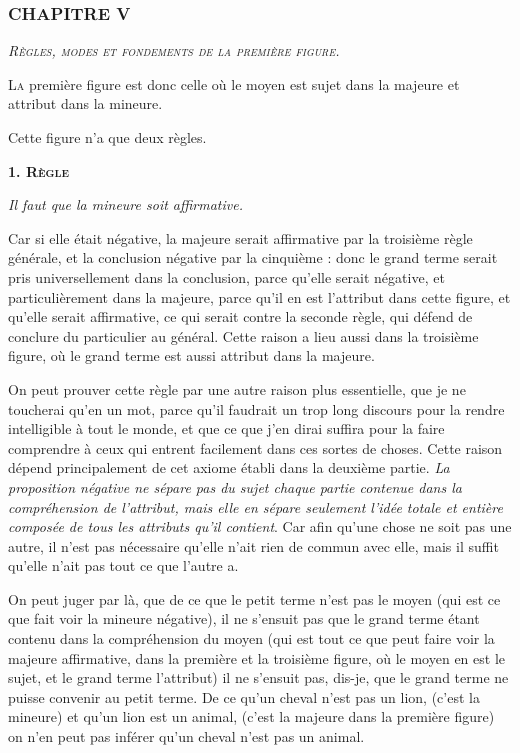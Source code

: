 \subsubsection{\centering \Large CHAPITRE V}
\begin{center}\emph{\large\scshape Règles, modes et fondements de la première figure.}\end{center}

	\lettrine{L}{a} première figure est donc celle où le moyen est sujet dans la majeure et attribut dans la mineure.

Cette figure n'a que deux règles.

\begin{center}{\bfseries\scshape\large 1. Règle}\end{center}

	\emph{Il faut que la mineure soit affirmative.}

Car si elle était négative, la majeure serait affirmative par la troisième règle générale, et la conclusion négative par la cinquième : donc le grand terme serait pris universellement dans la conclusion, parce qu'elle serait négative, et particulièrement dans la majeure, parce qu'il en est l'attribut dans cette figure, et qu'elle serait affirmative, ce qui serait contre la seconde règle, qui défend de conclure du particulier au général. Cette raison a lieu aussi dans la troisième figure, où le grand terme est aussi attribut dans la majeure.

On peut prouver cette règle par une autre raison plus essentielle, que je ne toucherai qu'en un mot, parce qu'il faudrait un trop long discours pour la rendre intelligible à tout le monde, et que ce que j'en dirai suffira pour la faire comprendre à ceux qui entrent facilement dans ces sortes de choses. Cette raison dépend principalement de cet axiome établi dans la deuxième partie. \emph{La proposition négative ne sépare pas du sujet chaque partie contenue dans la compréhension de l'attribut, mais elle en sépare seulement l'idée totale et entière composée de tous les attributs qu'il contient}. Car afin qu'une chose ne soit pas une autre, il n'est pas nécessaire qu'elle n'ait rien de commun avec elle, mais il suffit qu'elle n'ait pas tout ce que l'autre a.

On peut juger par là, que de ce que le petit terme n'est pas le moyen (qui est ce que fait voir la mineure négative), il ne s'ensuit pas que le grand terme étant contenu dans la compréhension du moyen (qui est tout ce que peut faire voir la majeure affirmative, dans la première et la troisième figure, où le moyen en est le sujet, et le grand terme l'attribut) il ne s'ensuit pas, dis-je, que le grand terme ne puisse convenir au petit terme. De ce qu'un cheval n'est pas un lion, (c'est la mineure) et qu'un lion est un animal, (c'est la majeure dans la première figure) on n'en peut pas inférer qu'un cheval n'est pas un animal.

